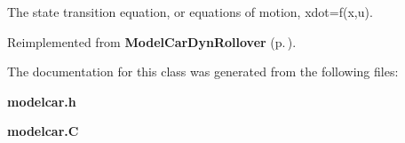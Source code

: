 The state transition equation, or equations of motion, xdot=f(x,u).



Reimplemented from {\bf Model\-Car\-Dyn\-Rollover} {\rm (p.\,\pageref{classModelCarDynRollover_a3})}.

The documentation for this class was generated from the following files:\begin{CompactItemize}
\item 
{\bf modelcar.h}\item 
{\bf modelcar.C}\end{CompactItemize}
